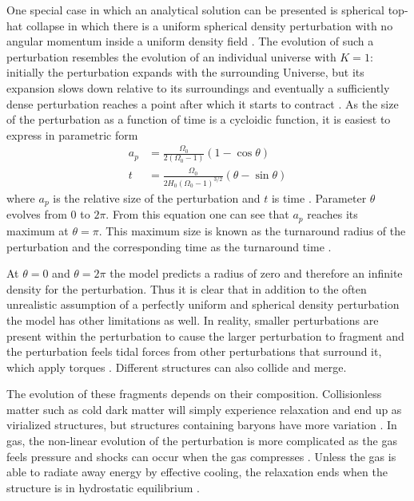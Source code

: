 \documentclass[english, twoside]{HYgradu}
\begin{document}
One special case in which an analytical solution can be presented is spherical top-hat collapse in which there is a uniform spherical density perturbation with no angular momentum inside a uniform density field \citep{longair2008galaxy}. The evolution of such a perturbation resembles the evolution of an individual universe with $K = 1$: initially the perturbation expands with the surrounding Universe, but its expansion slows down relative to its surroundings and eventually a sufficiently dense perturbation reaches a point after which it starts to contract \citep{longair2008galaxy}. As the size of the perturbation as a function of time is a cycloidic function, it is easiest to express in parametric form
\begin{align}
a_p &= \frac{\Omega_0}{2(\Omega_0-1)}(1-\cos\theta) \\
t &= \frac{\Omega_0}{2H_0(\Omega_0-1)^{3/2}}(\theta - \sin\theta)
\end{align}
where $a_p$ is the relative size of the perturbation and $t$ is time \citep{longair2008galaxy}. Parameter $\theta$ evolves from 0 to $2\pi$. From this equation one can see that $a_p$ reaches its maximum at $\theta = \pi$. This maximum size is known as the turnaround radius of the perturbation and the corresponding time as the turnaround time \citep{mo2010galaxy}.

At $\theta=0$ and $\theta = 2\pi$ the model predicts a radius of zero and therefore an infinite density for the perturbation. Thus it is clear that in addition to the often unrealistic assumption of a perfectly uniform and spherical density perturbation the model has other limitations as well. In reality, smaller perturbations are present within the perturbation to cause the larger perturbation to fragment and the perturbation feels tidal forces from other perturbations that surround it, which apply torques \citep{longair2008galaxy}. Different structures can also collide and merge.

The evolution of these fragments depends on their composition. Collisionless matter such as cold dark matter will simply experience relaxation and end up as virialized structures, but structures containing baryons have more variation \citep{mo2010galaxy}. In gas, the non-linear evolution of the perturbation is more complicated as the gas feels pressure and shocks can occur when the gas compresses \citep{mo2010galaxy}. Unless the gas is able to radiate away energy by effective cooling, the relaxation ends when the structure is in hydrostatic equilibrium \citep{mo2010galaxy}.
\end{document}
